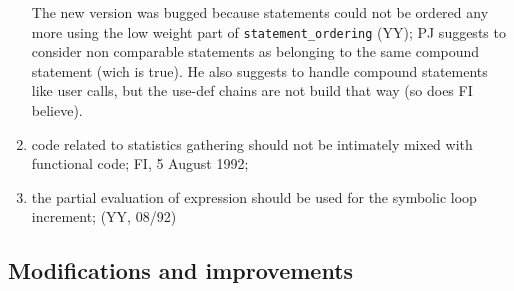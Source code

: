 \begin{enumerate}
The new version was bugged because statements could not be ordered
any more using the low weight part of \verb+statement_ordering+ (YY);
PJ suggests to consider non comparable statements as belonging to
the same compound statement (wich is true). He also suggests to
handle compound statements like user calls, but the use-def chains
are not build that way (so does FI believe).

  \item code related to statistics gathering should not be intimately
	mixed with functional code; FI, 5 August 1992;

  \item the partial evaluation of expression should be used for the
        symbolic loop increment; (YY, 08/92) 
\end{enumerate}

\subsection{Modifications and improvements}

